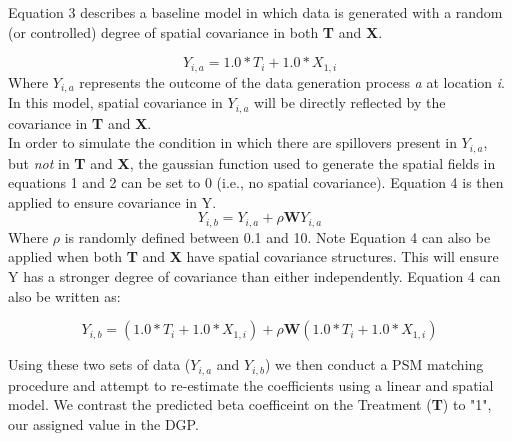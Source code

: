 \documentclass[10pt,a3paper]{report}
\begin{document}
Equation 3 describes a baseline model in which data is generated with a random (or controlled) degree of spatial covariance in both   \textbf{T} and \textbf{X}.

\begin{equation}
Y_{i,a} = 1.0 * T_{i} + 1.0 * X_{1,i}
\end{equation}
Where $Y_{i,a}$ represents the outcome of the data generation process \textit{a} at location \textit{i}.  In this model, spatial covariance in $Y_{i,a}$ will be directly reflected by the covariance in \textbf{T} and \textbf{X}.\\

In order to simulate the condition in which there are spillovers present in $Y_{i,a}$, but \textit{not} in \textbf{T} and \textbf{X}, the gaussian function used to generate the spatial fields in equations 1 and 2 can be set to 0 (i.e., no spatial covariance).  Equation 4 is then applied to ensure covariance in Y.  
\begin{equation} 
Y_{i,b} = Y_{i,a} + \rho \boldsymbol {W}Y_{i,a}
\end{equation}
Where $\rho$ is randomly defined between 0.1 and 10.  Note Equation 4 can also be applied when both \textbf{T} and \textbf{X} have spatial covariance structures.  This will ensure Y has a stronger degree of covariance than either independently. Equation 4 can also be written as:

\begin{equation}
Y_{i,b} = (1.0 * T_{i} + 1.0 * X_{1,i}) + \rho \boldsymbol {W}(1.0 * T_{i} + 1.0 * X_{1,i})
\end{equation}

Using these two sets of data ($Y_{i,a}$ and $Y_{i,b}$) we then conduct a PSM matching procedure and attempt to re-estimate the coefficients using a linear and spatial model.  We contrast the predicted beta coefficeint on the Treatment (\textbf{T}) to "1", our assigned value in the DGP.
\end{document}
